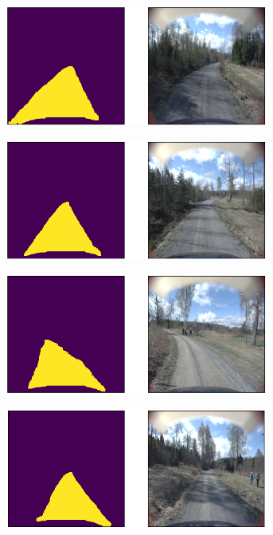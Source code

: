 \documentclass[USenglish]{ifimaster}  %
\begin{document}
\begin{appendices}
\begin{figure}[ht]
\centering
\begin{subfigure}[b]{\textwidth}
\centering
\includegraphics[width=0.95\textwidth]{bilder/appendix_2/875.png}
\end{subfigure}
\hfill
\begin{subfigure}[b]{\textwidth}
\centering
\includegraphics[width=0.95\textwidth]{bilder/appendix_2/951.png}
\end{subfigure}
\hfill
\begin{subfigure}[b]{\textwidth}
\centering
\includegraphics[width=0.95\textwidth]{bilder/appendix_2/1046.png}
\end{subfigure}
\hfill
\begin{subfigure}[b]{\textwidth}
\centering
\includegraphics[width=0.95\textwidth]{bilder/appendix_2/1152.png}
\end{subfigure}
\end{figure}


\end{appendices}
\end{document}
